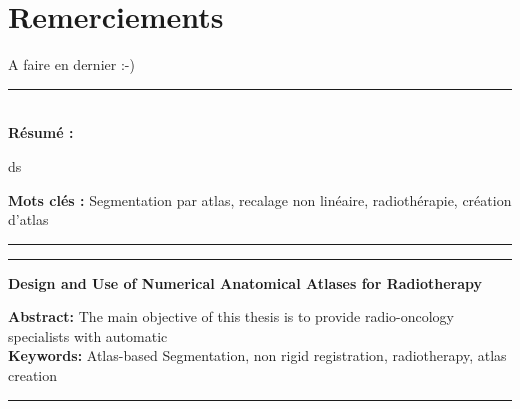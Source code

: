 \documentclass[a4paper,11pt,twoside]{StyleThese}
\begin{document}


\dominitoc
{}
\cleardoublepage

\section*{Remerciements}

A faire en dernier :-)

\tableofcontents

\mainmatter



\appendix






\printnomenclature

\cleardoublepage
\begin{vcenterpage}
\noindent\rule[2pt]{\textwidth}{0.5pt}
\\
{\large\textbf{Résumé :}}

ds


{\large\textbf{Mots clés :}}
Segmentation par atlas, recalage non linéaire, radiothérapie, création d'atlas
\\
\noindent\rule[2pt]{\textwidth}{0.5pt}
\end{vcenterpage}

\begin{vcenterpage}
\noindent\rule[2pt]{\textwidth}{0.5pt}
\begin{center}
{\large\textbf{Design and Use of Numerical Anatomical Atlases for Radiotherapy\\}}
\end{center}
{\large\textbf{Abstract:}}
The main objective of this thesis is to provide radio-oncology specialists with automatic  
\\
{\large\textbf{Keywords:}}
Atlas-based Segmentation, non rigid registration, radiotherapy, atlas creation
\\
\noindent\rule[2pt]{\textwidth}{0.5pt}
\end{vcenterpage}
\end{document}
